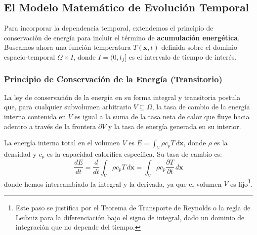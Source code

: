 \subsection{El Modelo Matemático de Evolución Temporal}
\label{subsec:heat-formulation}

Para incorporar la dependencia temporal, extendemos el principio de conservación de energía para incluir el término de \textbf{acumulación energética}. Buscamos ahora una función temperatura \(T(\bm{x}, t)\) definida sobre el dominio espacio-temporal \(\Omega \times I\), donde \(I = (0, t_f]\) es el intervalo de tiempo de interés.

\subsubsection{Principio de Conservación de la Energía (Transitorio)}
La ley de conservación de la energía en su forma integral y transitoria postula que, para cualquier subvolumen arbitrario \(V \subseteq \Omega\), la tasa de cambio de la energía interna contenida en \(V\) es igual a la suma de la tasa neta de calor que fluye hacia adentro a través de la frontera \(\partial V\) y la tasa de energía generada en su interior.

La energía interna total en el volumen \(V\) es \(E = \int_V \rho c_p T \, d\bm{x}\), donde \(\rho\) es la densidad y \(c_p\) es la capacidad calorífica específica. Su tasa de cambio es:
\[
\frac{dE}{dt} = \frac{d}{dt} \int_V \rho c_p T \, d\bm{x} = \int_V \rho c_p \frac{\partial T}{\partial t} \, d\bm{x}
\]
donde hemos intercambiado la integral y la derivada, ya que el volumen \(V\) es fijo\footnote{Este paso se justifica por el Teorema de Transporte de Reynolds o la regla de Leibniz para la diferenciación bajo el signo de integral, dado un dominio de integración que no depende del tiempo.}.

